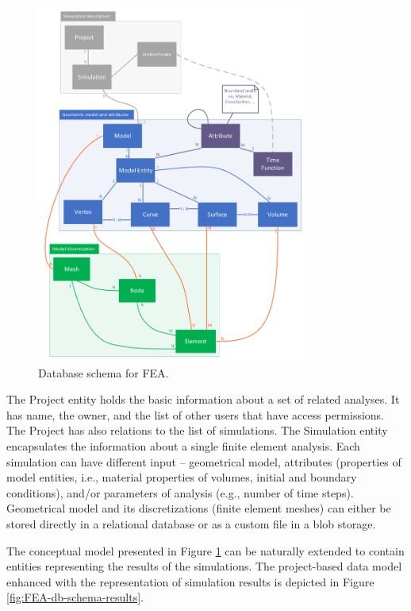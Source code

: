 \begin{figure}[H]
    \centering
    \includegraphics[width=0.8\textwidth]{figures/chapter-data-management/FEA-database-schema}
    \decoRule
    \caption{Database schema for FEA.}
    \label{fig:FEA-db-schema}
\end{figure}

The Project entity holds the basic information about a set of related analyses. It has name, the owner, and the list of other users that have access permissions. The Project has also relations to the list of simulations. The Simulation entity encapsulates the information about a single finite element analysis. Each simulation can have different input -- geometrical model, attributes (properties of model entities, i.e., material properties of volumes, initial and boundary conditions), and/or parameters of analysis (e.g., number of time steps). Geometrical model and its discretizations (finite element meshes) can either be stored directly in a relational database or as a custom file in a blob storage.

The conceptual model presented in Figure \ref{fig:FEA-db-schema} can be naturally extended to contain entities representing the results of the simulations. The project-based data model enhanced with the representation of simulation results is depicted in Figure \ref{fig:FEA-db-schema-results}.

